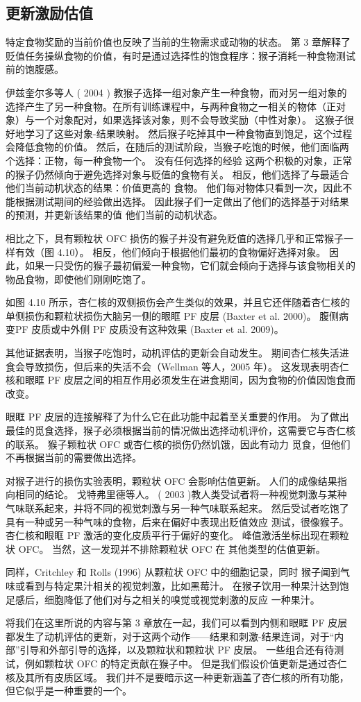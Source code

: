 \subsection{更新激励估值}
特定食物奖励的当前价值也反映了当前的生物需求或动物的状态。 第 3 章解释了贬值任务操纵食物的价值，有时是通过选择性的饱食程序：猴子消耗一种食物测试前的饱腹感。\par
伊兹奎尔多等人 ( 2004 ) 教猴子选择一组对象产生一种食物，而对另一组对象的选择产生了另一种食物。在所有训练课程中，与两种食物之一相关的物体（正对象）与一个对象配对，如果选择该对象，则不会导致奖励（中性对象）。 这猴子很好地学习了这些对象-结果映射。 然后猴子吃掉其中一种食物直到饱足，这个过程会降低食物的价值。 然后，在随后的测试阶段，当猴子吃饱的时候，他们面临两个选择：正物，每一种食物一个。 没有任何选择的经验
这两个积极的对象，正常的猴子仍然倾向于避免选择对象与贬值的食物有关。 相反，他们选择了与最适合他们当前动机状态的结果：价值更高的
食物。 他们每对物体只看到一次，因此不能根据测试期间的经验做出选择。 因此猴子们一定做出了他们的选择基于对结果的预测，并更新该结果的值
他们当前的动机状态。\par
相比之下，具有颗粒状 OFC 损伤的猴子并没有避免贬值的选择几乎和正常猴子一样有效（图 4.10）。 相反，他们倾向于根据他们最初的食物偏好选择对象。 因此，如果一只受伤的猴子最初偏爱一种食物，它们就会倾向于选择与该食物相关的物品食物，即使他们刚刚吃饱了。\par
如图 4.10 所示，杏仁核的双侧损伤会产生类似的效果，并且它还伴随着杏仁核的单侧损伤和颗粒状损伤大脑另一侧的眼眶 PF 皮层 (Baxter et al. 2000)。 腹侧病变PF 皮质或中外侧 PF 皮质没有这种效果 (Baxter et al. 2009)。\par
其他证据表明，当猴子吃饱时，动机评估的更新会自动发生。 期间杏仁核失活进食会导致损伤，但后来的失活不会（Wellman 等人，2005 年）。 这发现表明杏仁核和眼眶 PF 皮层之间的相互作用必须发生在进食期间，因为食物的价值因饱食而改变。\par
眼眶 PF 皮层的连接解释了为什么它在此功能中起着至关重要的作用。 为了做出最佳的觅食选择，猴子必须根据当前的情况做出选择动机评价，这需要它与杏仁核的联系。 猴子颗粒状 OFC 或杏仁核的损伤仍然饥饿，因此有动力
觅食，但他们不再根据当前的需要做出选择。\par
对猴子进行的损伤实验表明，颗粒状 OFC 会影响估值更新。 人们的成像结果指向相同的结论。 戈特弗里德等人。 ( 2003 )教人类受试者将一种视觉刺激与某种气味联系起来，并将不同的视觉刺激与另一种气味联系起来。 然后受试者吃饱了具有一种或另一种气味的食物，后来在偏好中表现出贬值效应
测试，很像猴子。 杏仁核和眼眶 PF 激活的变化皮质平行于偏好的变化。 峰值激活坐标出现在颗粒状 OFC。 当然，这一发现并不排除颗粒状 OFC 在
其他类型的估值更新。\par
同样，Critchley 和 Rolls (1996) 从颗粒状 OFC 中的细胞记录，同时
猴子闻到气味或看到与特定果汁相关的视觉刺激，比如黑莓汁。 在猴子饮用一种果汁达到饱足感后，细胞降低了他们对与之相关的嗅觉或视觉刺激的反应
一种果汁。\par
将我们在这里所说的内容与第 3 章放在一起，我们可以看到内侧和眼眶 PF 皮层都发生了动机评估的更新，对于这两个动作——结果和刺激-结果连词，对于“内部”引导和外部引导的选择，以及颗粒状和颗粒状 PF 皮层。 一些组合还有待测试，例如颗粒状 OFC 的特定贡献在猴子中。 但是我们假设价值更新是通过杏仁核及其所有皮质区域。 我们并不是要暗示这一种更新涵盖了杏仁核的所有功能，但它似乎是一种重要的一个。\par
